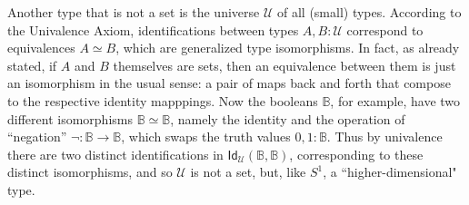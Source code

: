 \documentclass[11pt]{article}
\newcommand{\B}{\ensuremath{\mathbb{B}}}
\newcommand{\Id}{\mathsf{Id}}
\newcommand{\id}[1]{\Id_{#1}}
\newcommand{\U}{\ensuremath{\mathcal{U}}}
\theoremstyle{remark}
\theoremstyle{definition}
\begin{document}
Another type that is not a set is the universe $\U$ of all (small) types.  According to the Univalence Axiom, identifications between types $A,B:\U$ correspond to equivalences $A\simeq B$, which are generalized type isomorphisms.  In fact, as already stated, if $A$ and $B$ themselves are sets, then an equivalence between them is just an isomorphism in the usual sense: a pair of maps back and forth that compose to the respective identity mapppings.  Now the booleans $\B$, for example, have two different isomorphisms $\B\simeq \B$, namely the identity and the operation of ``negation'' $\neg:\B\to\B$, which swaps the truth values $0,1:\B$.  Thus by univalence there are two distinct identifications in $\id{\U}(\B,\B)$, corresponding to these distinct isomorphisms, and so $\U$ is not a set, but, like $S^1$, a ``higher-dimensional" type.  
 
\end{document}

